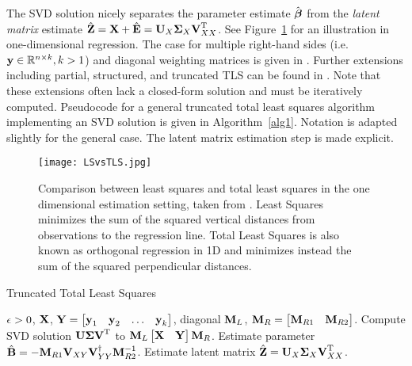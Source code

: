 \noindent The SVD solution nicely separates the parameter estimate $\hat{\boldsymbol{\mathrm{\beta}}}$ from the \emph{latent matrix} estimate $\hat{\boldsymbol{\mathrm{Z}}} = \boldsymbol{\mathrm{X}} + \hat{\boldsymbol{\mathrm{E}}} = \boldsymbol{\mathrm{U}}_{X} \boldsymbol{\mathrm{\Sigma}}_{X} \boldsymbol{\mathrm{V}}_{XX}^{\mathrm{T}}$. See Figure~\ref{Figure1} for an illustration in one-dimensional regression. The case for multiple right-hand sides (i.e. $\boldsymbol{\mathrm{y}} \in \mathbb{R}^{n \times k}, k > 1$) and diagonal weighting matrices is given in \cite{Golub96}. Further extensions including partial, structured, and truncated TLS can be found in \cite{VanHuffel91}. Note that these extensions often lack a closed-form solution and must be iteratively computed.
Pseudocode for a general truncated total least squares algorithm implementing an SVD solution is given in Algorithm~\ref{alg1}. Notation is adapted slightly for the general case. The latent matrix estimation step is made explicit. %
%
\begin{figure}
\centering
\texttt{[image: LSvsTLS.jpg]}%
\caption{Comparison between least squares and total least squares in the one dimensional estimation setting, taken from \cite{Golub80}. Least Squares minimizes the sum of the squared vertical distances from observations to the regression line. Total Least Squares is also known as orthogonal regression in 1D and minimizes instead the sum of the squared perpendicular distances.}
\label{Figure1}
\end{figure}
%
%
\begin{algorithm}[tb]
   \caption{Truncated Total Least Squares}
   \label{alg1}
\begin{algorithmic}
    $\epsilon > 0$, $\boldsymbol{\mathrm{X}}$, $\boldsymbol{\mathrm{Y}} = \begin{bmatrix} \boldsymbol{\mathrm{y}}_1 & \boldsymbol{\mathrm{y}}_2 & \ldots & \boldsymbol{\mathrm{y}}_k \end{bmatrix}$, diagonal $\boldsymbol{\mathrm{M}}_{L}$, $\boldsymbol{\mathrm{M}}_{R} = \begin{bmatrix} \boldsymbol{\mathrm{M}}_{R1} & \boldsymbol{\mathrm{M}}_{R2}\end{bmatrix}$.
   \STATE Compute SVD solution $\boldsymbol{\mathrm{U}} \boldsymbol{\mathrm{\Sigma}} \boldsymbol{\mathrm{V}}^{\mathrm{T}}$ to $\boldsymbol{\mathrm{M}}_{L}\begin{bmatrix} \boldsymbol{\mathrm{X}} & \boldsymbol{\mathrm{Y}} \end{bmatrix}\boldsymbol{\mathrm{M}}_{R}$.
   \STATE Estimate parameter $\hat{\boldsymbol{\mathrm{B}}} = -\boldsymbol{\mathrm{M}}_{R1}\boldsymbol{\mathrm{V}}_{XY}\boldsymbol{\mathrm{V}}_{YY}^{\dagger}\boldsymbol{\mathrm{M}}_{R2}^{-1}$.
   \STATE Estimate latent matrix $\hat{\boldsymbol{\mathrm{Z}}} = \boldsymbol{\mathrm{U}}_{X} \boldsymbol{\mathrm{\Sigma}}_{X} \boldsymbol{\mathrm{V}}_{XX}^{\mathrm{T}}$.
\end{algorithmic}
\end{algorithm}
%
%
